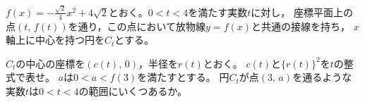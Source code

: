 \documentclass[../../main.tex]{subfiles}
\begin{document}
$\displaystyle f(x)=-\frac{\sqrt2}{4}x^2+4\sqrt2$とおく。$0<t<4$を満たす実数$t$に対し，
座標平面上の点$(t, \, f(t))$を通り，この点において放物線$y=f(x)$と共通の接線を持ち，
$x$軸上に中心を持つ円を$C_t$とする。
\begin{enumerate}
  $C_t$の中心の座標を$(c(t), \, 0)$，半径を$r(t)$とおく。
    $c(t)$と${ \{ r(t) \} }^2$を$t$の整式で表せ。
  $a$は$0<a<f(3)$を満たすとする。
    円$C_t$が点$(3, \, a)$を通るような実数$t$は$0<t<4$の範囲にいくつあるか。
\end{enumerate}
\end{document}
